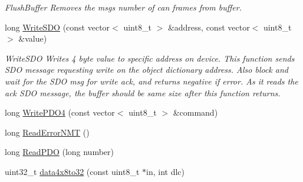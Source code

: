 \begin{DoxyCompactItemize}
\begin{DoxyCompactList}\small\item\em Flush\+Buffer Removes the msgs number of can frames from buffer. \end{DoxyCompactList}\item 
long \hyperlink{classCiA301CommPort_a4d97c27423b2323f8475f6e5c2f91575}{Write\+S\+DO} (const vector$<$ uint8\+\_\+t $>$ \&address, const vector$<$ uint8\+\_\+t $>$ \&value)
\begin{DoxyCompactList}\small\item\em Write\+S\+DO Writes 4 byte value to specific address on device. This function sends S\+DO message requesting write on the object dictionary address. Also block and wait for the S\+DO msg for write ack, and returns negative if error. As it reads the ack S\+DO message, the buffer should be same size after this function returns. \end{DoxyCompactList}\item 
long \hyperlink{classCiA301CommPort_a1faf4f37530e0dd0ae4600cfb0b1d742}{Write\+P\+D\+O4} (const vector$<$ uint8\+\_\+t $>$ \&command)
\item 
long \hyperlink{classCiA301CommPort_a46534ff9e7e2a05a0b4913e4331710e5}{Read\+Error\+N\+MT} ()
\item 
long \hyperlink{classCiA301CommPort_a827f3e594b9f1e57a7b7ccb8a278404a}{Read\+P\+DO} (long number)
\item 
uint32\+\_\+t \hyperlink{classCiA301CommPort_a2e85303159577f6b3209b741e9871cc5}{data4x8to32} (const uint8\+\_\+t $\ast$in, int dlc)
\end{DoxyCompactItemize}
